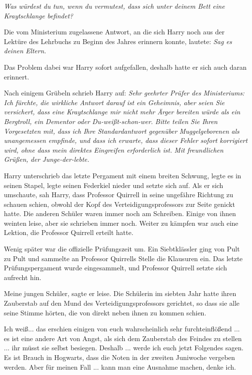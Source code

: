 \emph{\glqq{}Was würdest du tun, wenn du vermutest, dass sich unter deinem Bett
eine Kraytschlange befindet?\grqq{}}

Die vom Ministerium zugelassene Antwort, an die sich Harry noch aus der Lektüre
des Lehrbuchs zu Beginn des Jahres erinnern konnte, lautete: \emph{Sag es deinen
Eltern.}

Das Problem dabei war Harry sofort aufgefallen, deshalb hatte er sich auch daran
erinnert.

Nach einigem Grübeln schrieb Harry auf:
\emph{Sehr geehrter Prüfer des Ministeriums:}
\emph{Ich fürchte, die wirkliche Antwort darauf ist ein Geheimnis, aber seien
Sie versichert, dass eine Kraytschlange mir nicht mehr Ärger bereiten würde als
ein Bergtroll, ein Dementor oder Du-weißt-schon-wer.} \emph{Bitte teilen Sie
Ihren Vorgesetzten mit, dass ich Ihre Standardantwort gegenüber
}\emph{Muggelgeborenen als unangemessen empfinde, und dass ich erwarte, dass
dieser Fehler sofort korrigiert wird, ohne dass mein direktes Eingreifen
erforderlich ist.} \emph{ Mit freundlichen Grüßen,}
\emph{der Junge-der-lebte.}

Harry unterschrieb das letzte Pergament mit einem breiten Schwung, legte es in
seinen Stapel, legte seinen Federkiel nieder und setzte sich auf. Als er sich
umschaute, sah Harry, dass Professor Quirrell in seine ungefähre Richtung zu
schauen schien, obwohl der Kopf des Verteidigungsprofessors zur Seite genickt
hatte. Die anderen Schüler waren immer noch am Schreiben. Einige von ihnen
weinten leise, aber sie schrieben immer noch. Weiter zu kämpfen war auch eine
Lektion, die Professor Quirrell erteilt hatte.

Wenig später war die offizielle Prüfungszeit um. Ein Siebtklässler ging von Pult
zu Pult und sammelte an Professor Quirrells Stelle die Klausuren ein. Das letzte
Prüfungspergament wurde eingesammelt, und Professor Quirrell setzte sich
aufrecht hin.

\glqq{}Meine jungen Schüler\grqq{}, sagte er leise. Die Schülerin im siebten Jahr
hatte ihren Zauberstab auf den Mund des Verteidigungsprofessors gerichtet, so
dass sie alle seine Stimme hörten, die von direkt neben ihnen zu kommen schien.

\glqq{}Ich weiß... das erschien einigen von euch wahrscheinlich sehr
furchteinflößend ... es ist eine andere Art von Angst, als sich dem Zauberstab
des Feindes zu stellen ... ihr müsst sie selbst besiegen. Deshalb ... werde ich
euch jetzt Folgendes sagen. Es ist Brauch in Hogwarts, dass die Noten in der
zweiten Juniwoche vergeben werden. Aber für meinen Fall ... kann man eine
Ausnahme machen, denke ich.\grqq{}

